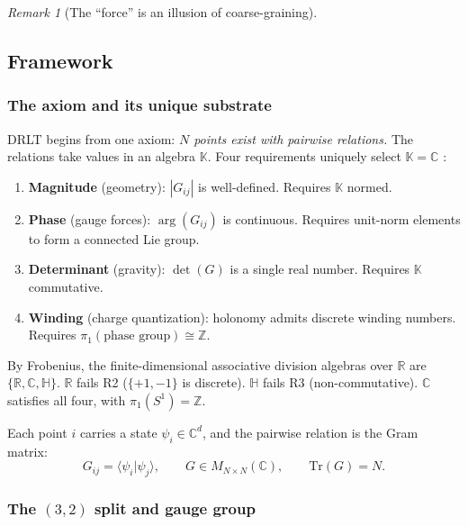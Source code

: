 \documentclass[12pt]{article}
\theoremstyle{remark}
\newtheorem{remark}[theorem]{Remark}
\theoremstyle{definition}
\newcommand{\CC}{\mathbb{C}}
\newcommand{\RR}{\mathbb{R}}
\begin{document}
\begin{remark}[The ``force'' is an illusion of coarse-graining]
\subsection{Framework}
\label{sec:framework}

\subsubsection{The axiom and its unique substrate}

DRLT begins from one axiom: \emph{$N$ points exist with pairwise
relations.} The relations take values in an algebra $\mathbb{K}$.
Four requirements uniquely select $\mathbb{K} = \CC$
\cite{Frobenius}:

\begin{enumerate}
\item[\textbf{R1.}] \textbf{Magnitude} (geometry): $|G_{ij}|$ is
  well-defined. Requires $\mathbb{K}$ normed.
\item[\textbf{R2.}] \textbf{Phase} (gauge forces): $\arg(G_{ij})$ is
  continuous. Requires unit-norm elements to form a connected Lie group.
\item[\textbf{R3.}] \textbf{Determinant} (gravity): $\det(G)$ is a
  single real number. Requires $\mathbb{K}$ commutative.
\item[\textbf{R4.}] \textbf{Winding} (charge quantization): holonomy
  admits discrete winding numbers. Requires
  $\pi_1(\text{phase group}) \cong \mathbb{Z}$.
\end{enumerate}

\noindent
By Frobenius, the finite-dimensional associative division algebras over
$\RR$ are $\{\RR, \CC, \mathbb{H}\}$. $\RR$
fails R2 ($\{+1,-1\}$ is discrete). $\mathbb{H}$ fails R3
(non-commutative). $\CC$ satisfies all four, with
$\pi_1(S^1) = \mathbb{Z}$.

Each point $i$ carries a state $\psi_i \in \CC^d$, and the
pairwise relation is the Gram matrix:
\begin{equation}
G_{ij} = \langle \psi_i | \psi_j \rangle, \qquad
G \in M_{N \times N}(\CC), \qquad
\mathrm{Tr}(G) = N.
\end{equation}

\subsubsection{The $(3,2)$ split and gauge group}


\end{remark}
\end{document}
